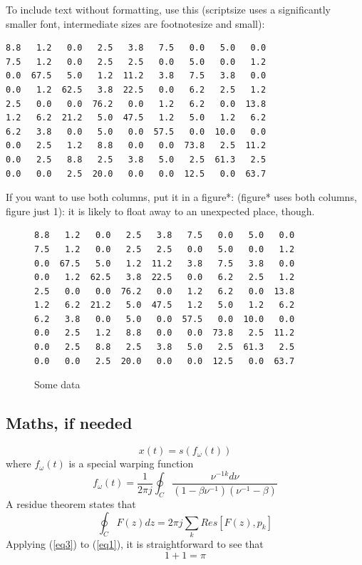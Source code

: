 \documentclass[10pt,a4paper,twocolumn]{article}
\begin{document}
To include text without formatting, use this
(scriptsize uses a significantly smaller font,
intermediate sizes are footnotesize and small):
{\scriptsize
\begin{verbatim}
8.8   1.2   0.0   2.5   3.8   7.5   0.0   5.0   0.0
7.5   1.2   0.0   2.5   2.5   0.0   5.0   0.0   1.2
0.0  67.5   5.0   1.2  11.2   3.8   7.5   3.8   0.0
0.0   1.2  62.5   3.8  22.5   0.0   6.2   2.5   1.2
2.5   0.0   0.0  76.2   0.0   1.2   6.2   0.0  13.8
1.2   6.2  21.2   5.0  47.5   1.2   5.0   1.2   6.2
6.2   3.8   0.0   5.0   0.0  57.5   0.0  10.0   0.0
0.0   2.5   1.2   8.8   0.0   0.0  73.8   2.5  11.2
0.0   2.5   8.8   2.5   3.8   5.0   2.5  61.3   2.5
0.0   0.0   2.5  20.0   0.0   0.0  12.5   0.0  63.7
\end{verbatim}
}

If you want to use both columns, put it in a figure*:
(figure* uses both columns, figure just 1):
it is likely to float away to an unexpected place, though.
\begin{figure}[htb]
  \centering

  \begin{minipage}[h]{0.7\linewidth}
\begin{verbatim}
8.8   1.2   0.0   2.5   3.8   7.5   0.0   5.0   0.0
7.5   1.2   0.0   2.5   2.5   0.0   5.0   0.0   1.2
0.0  67.5   5.0   1.2  11.2   3.8   7.5   3.8   0.0
0.0   1.2  62.5   3.8  22.5   0.0   6.2   2.5   1.2
2.5   0.0   0.0  76.2   0.0   1.2   6.2   0.0  13.8
1.2   6.2  21.2   5.0  47.5   1.2   5.0   1.2   6.2
6.2   3.8   0.0   5.0   0.0  57.5   0.0  10.0   0.0
0.0   2.5   1.2   8.8   0.0   0.0  73.8   2.5  11.2
0.0   2.5   8.8   2.5   3.8   5.0   2.5  61.3   2.5
0.0   0.0   2.5  20.0   0.0   0.0  12.5   0.0  63.7
\end{verbatim}
  \end{minipage}

  \caption{Some data}
  
\end{figure}

\subsection{Maths, if needed}

%
\begin{equation}
x(t) = s(f_\omega(t))
\label{eq1}
\end{equation}
where \(f_\omega(t)\) is a special warping function
\begin{equation}
f_\omega(t)=\frac{1}{2\pi j}\oint_C \frac{\nu^{-1k}d\nu}
{(1-\beta\nu^{-1})(\nu^{-1}-\beta)}
\label{eq2}
\end{equation}
A residue theorem states that
\begin{equation}
\oint_C F(z)dz=2 \pi j \sum_k Res[F(z),p_k]
\label{eq3}
\end{equation}
Applying (\ref{eq3}) to (\ref{eq1}), 
it is straightforward to see that
\begin{equation}
1 + 1 = \pi
\label{eq4}
\end{equation}
\end{document}
